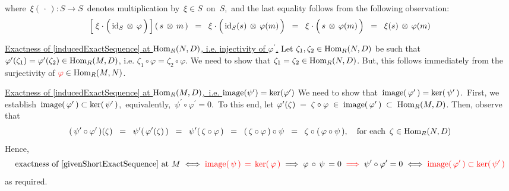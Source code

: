 \begin{enumerate}
	where \,$\xi(\,\cdot\,) : S \longrightarrow S$\, denotes multiplication by \,$\xi \in S$\, on \,$S$,\,
	and the last equality follows from the following observation:
	\begin{equation*}
	\left[\;\xi \cdot \left(\, \id_{S} \,\overset{{\color{white}.}}{\otimes}\, \varphi \,\right)\,\right](\,s \,\otimes\, m\,)
	\;\; = \;\;
		\xi \cdot \left(\, \id_{S}(s) \,\overset{{\color{white}.}}{\otimes}\, \varphi(m) \,\right)
	\;\; = \;\;
		\xi \cdot \left(\, s \,\overset{{\color{white}.}}{\otimes}\, \varphi(m) \,\right)
	\;\; = \;\;
		\xi(s) \,\overset{{\color{white}.}}{\otimes}\, \varphi(m)
	\end{equation*}
\end{enumerate}

\vskip 0.25cm
\noindent
\underline{Exactness of \eqref{inducedExactSequence} at $\textnormal{Hom}_{R}(N,D)$, i.e. {\color{red}injectivity of $\varphi^{\prime}$}{\color{white}.}}
\vskip 0.25cm
\noindent
Let $\zeta_{1}, \zeta_{2} \in \textnormal{Hom}_{R}(N,D)$ be such that
$\varphi^{\prime}(\zeta_{1}) = \varphi^{\prime}(\zeta_{2}) \in \textnormal{Hom}_{R}(M,D)$, i.e.
$\zeta_{1} \circ \varphi = \zeta_{2} \circ \varphi$.
We need to show that $\zeta_{1} = \zeta_{2} \in \textnormal{Hom}_{R}(N,D)$.
But, this follows immediately from the {\color{red}surjectivity of} ${\color{red}\varphi} \in \textnormal{Hom}_{R}(M,N)$.


\vskip 0.50cm
\noindent
\underline{Exactness of \eqref{inducedExactSequence} at $\textnormal{Hom}_{R}(M,D)$,\, i.e. $\textnormal{image}(\psi^{\prime}) = \ker(\varphi^{\prime})$}
\vskip 0.25cm
\noindent
We need to show that \,$\textnormal{image}(\,\varphi^{\prime}\,) = \ker(\,\psi^{\prime}\,)$.\,
First, we establish \,$\textnormal{image}(\,\varphi^{\prime}\,) \subset \ker(\,\psi^{\prime}\,)$,\,
equivalently, \,$\psi^{\prime} \circ \varphi^{\prime} = 0$.\,
To this end, let
$\varphi^{\prime}(\zeta) \;=\; \zeta \circ \varphi \;\in\; \textnormal{image}(\,\varphi^{\prime}\,) \;\subset\; \textnormal{Hom}_{R}(M,D)$.
Then, observe that
\begin{equation*}
(\,\psi^{\prime}\circ\varphi^{\prime}\,)(\zeta)
\;\; = \;\;
	\psi^{\prime}(\,\varphi^{\prime}(\zeta)\,)
\;\; = \;\;
	\psi^{\prime}(\,\zeta \circ \varphi\,)
\;\; = \;\;
	(\,\zeta \circ \varphi\,) \circ \psi
\;\; = \;\;
	\zeta \circ (\,\varphi \circ \psi\,),
\quad
	\textnormal{for each \,$\zeta \in \textnormal{Hom}_{R}(N,D)$}
\end{equation*}
Hence,
\begin{equation*}
\textnormal{exactness of \eqref{givenShortExactSequence} at $M$}
\; \Longleftrightarrow \;
	{\color{red}\textnormal{image}(\,\psi\,) \,=\, \ker(\,\varphi\,)}
\; \Longrightarrow \;
	\varphi \,\circ\, \psi \,= 0
\;\; {\color{red}\Longrightarrow} \;\;
	\psi^{\prime} \circ \varphi^{\prime} = 0
\; \Longleftrightarrow \;
	{\color{red}\textnormal{image}(\,\varphi^{\prime}\,) \subset \ker(\,\psi^{\prime}\,)}
\end{equation*}
as required.

